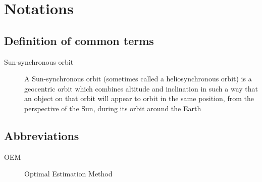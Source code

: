 \chapter*{Notations}
\label{chapter:notations}

\section*{Definition of common terms}

\begin{description}
\item[Sun-synchronous orbit]
A Sun-synchronous orbit (sometimes called a heliosynchronous orbit) is a geocentric orbit which combines altitude and inclination in such a way that an object on that orbit will appear to orbit in the same position, from the perspective of the Sun, during its orbit around the Earth
\end{description}





\section*{Abbreviations} 

\begin{description}
\item[OEM] Optimal Estimation Method
\end{description}





